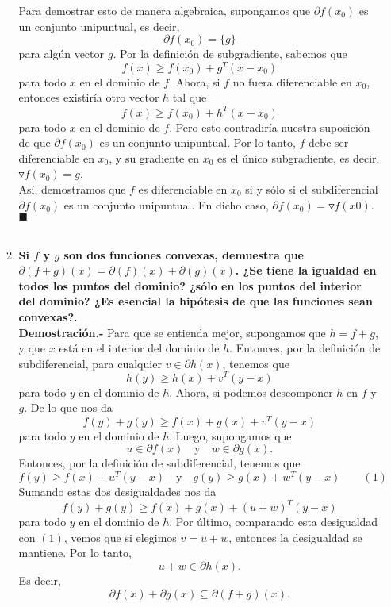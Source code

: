 \begin{enumerate}
\begin{enumerate}[\bfseries (a)]
		Para demostrar esto de manera algebraica, supongamos que $\partial f(x_0)$ es un conjunto unipuntual, es decir, 
		$$\partial f(x_0) = \{g\}$$ para algún vector $g$. Por la definición de subgradiente, sabemos que 
		$$f(x) \geq f(x_0) + g^T (x - x_0)$$ 
		para todo $x$ en el dominio de $f$. Ahora, si $f$ no fuera diferenciable en $x_0$, entonces existiría otro vector $h$ tal que 
		$$f(x) \geq f(x_0) + h^T (x - x_0)$$
		para todo $x$ en el dominio de $f$. Pero esto contradiría nuestra suposición de que $\partial f(x_0)$ es un conjunto unipuntual. Por lo tanto, $f$ debe ser diferenciable en $x_0$, y su gradiente en $x_0$ es el único subgradiente, es decir, $\triangledown f(x_0) = g$.\\

		Así, demostramos que $f$ es diferenciable en $x_0$ si y sólo si el subdiferencial $\partial f(x_0)$ es un conjunto unipuntual. En dicho caso, $\partial f(x_0) = {\triangledown f(x0)}$. $\blacksquare$\\\\


	    \item  \textbf{\boldmath Si $f$ y $g$ son dos funciones convexas, demuestra que $\partial (f+g)(x) = \partial (f)(x)+\partial (g)(x)$. ¿Se tiene la igualdad en todos los puntos del dominio? ¿sólo en los puntos del interior del dominio? ¿Es esencial la hipótesis de que las funciones sean convexas?.}\\

		\textbf{Demostración.-}\; Para que se entienda mejor, supongamos que $h = f + g$, y que $x$ está en el interior del dominio de $h$. Entonces, por la definición de subdiferencial, para cualquier $v \in \partial h(x)$, tenemos que 
		$$h(y) \geq h(x) + v^T (y - x)$$ 
		para todo $y$ en el dominio de $h$. Ahora, si podemos descomponer $h$ en $f$ y $g$. De lo que nos da
		$$f(y) + g(y) \geq f(x) + g(x) + v^T (y - x)$$ 
		para todo $y$ en el dominio de $h$. Luego, supongamos que 
		$$u \in \partial f(x) \quad \text{y} \quad w \in \partial g(x).$$ 
		Entonces, por la definición de subdiferencial, tenemos que 
		$$f(y) \geq f(x) + u^T (y - x) \quad \text{y}\quad g(y) \geq g(x) + w^T (y - x)\qquad (1)$$ 
		Sumando estas dos desigualdades nos da 
		$$f(y) + g(y) \geq f(x) + g(x) + (u + w)^T (y - x)$$ 
		para todo $y$ en el dominio de $h$. Por último, comparando esta desigualdad con $(1)$, vemos que si elegimos $v = u + w$, entonces la desigualdad se mantiene. Por lo tanto, 
		$$u + w \in \partial h(x).$$ 
		Es decir, 
		$$\partial f(x) + \partial g(x) \subseteq \partial (f+g)(x).$$\\


\end{enumerate}
\end{enumerate}
